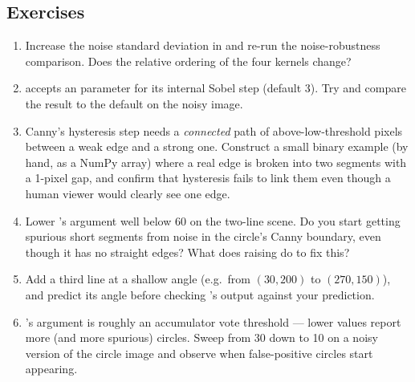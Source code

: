 \subsection*{Exercises}
\begin{enumerate}
  \item Increase the noise standard deviation in  and re-run the noise-robustness comparison. Does the relative ordering of the four kernels change?
  \item {} accepts an  parameter for its internal Sobel step (default 3). Try  and compare the result to the default on the noisy image.
  \item Canny's hysteresis step needs a \emph{connected} path of above-low-threshold pixels between a weak edge and a strong one. Construct a small binary example (by hand, as a NumPy array) where a real edge is broken into two segments with a 1-pixel gap, and confirm that hysteresis fails to link them even though a human viewer would clearly see one edge.
  \item Lower 's  argument well below 60 on the two-line scene. Do you start getting spurious short segments from noise in the circle's Canny boundary, even though it has no straight edges? What does raising  do to fix this?
  \item Add a third line at a shallow angle (e.g.\ from $(30,200)$ to $(270,150)$), and predict its angle before checking 's output against your prediction.
  \item {}'s  argument is roughly an accumulator vote threshold --- lower values report more (and more spurious) circles. Sweep  from 30 down to 10 on a noisy version of the circle image and observe when false-positive circles start appearing.
\end{enumerate}

\vfill
{}
